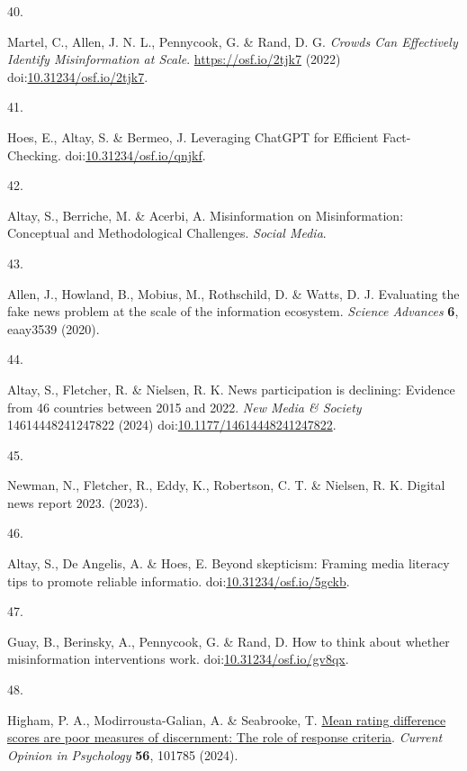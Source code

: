 \documentclass[
  doc,floatsintext]{apa6}
\newlength{\cslhangindent}
\newlength{\csllabelwidth}
\newenvironment{CSLReferences}[2] %
 {\begin{list}{}{%
  \setlength{\itemindent}{0pt}
  \setlength{\leftmargin}{0pt}
  \setlength{\parsep}{0pt}
  \ifodd #1
   \setlength{\leftmargin}{\cslhangindent}
   \setlength{\itemindent}{-1\cslhangindent}
  \fi
  \setlength{\itemsep}{#2\baselineskip}}}
 {\end{list}}
\newcommand{\CSLLeftMargin}[1]{\parbox[t]{\csllabelwidth}{\strut#1\strut}}
\newcommand{\CSLRightInline}[1]{\parbox[t]{\linewidth - \csllabelwidth}{\strut#1\strut}}
\begin{document}
\begin{CSLReferences}{0}{0}
\CSLLeftMargin{40. }%
\CSLRightInline{Martel, C., Allen, J. N. L., Pennycook, G. \& Rand, D. G. \emph{Crowds Can Effectively Identify Misinformation at Scale}. \url{https://osf.io/2tjk7} (2022) doi:\href{https://doi.org/10.31234/osf.io/2tjk7}{10.31234/osf.io/2tjk7}.}

\CSLLeftMargin{41. }%
\CSLRightInline{Hoes, E., Altay, S. \& Bermeo, J. Leveraging ChatGPT for Efficient Fact-Checking. doi:\href{https://doi.org/10.31234/osf.io/qnjkf}{10.31234/osf.io/qnjkf}.}

\CSLLeftMargin{42. }%
\CSLRightInline{Altay, S., Berriche, M. \& Acerbi, A. Misinformation on Misinformation: Conceptual and Methodological Challenges. \emph{Social Media}.}

\CSLLeftMargin{43. }%
\CSLRightInline{Allen, J., Howland, B., Mobius, M., Rothschild, D. \& Watts, D. J. Evaluating the fake news problem at the scale of the information ecosystem. \emph{Science Advances} \textbf{6}, eaay3539 (2020).}

\CSLLeftMargin{44. }%
\CSLRightInline{Altay, S., Fletcher, R. \& Nielsen, R. K. News participation is declining: Evidence from 46 countries between 2015 and 2022. \emph{New Media \& Society} 14614448241247822 (2024) doi:\href{https://doi.org/10.1177/14614448241247822}{10.1177/14614448241247822}.}

\CSLLeftMargin{45. }%
\CSLRightInline{Newman, N., Fletcher, R., Eddy, K., Robertson, C. T. \& Nielsen, R. K. Digital news report 2023. (2023).}

\CSLLeftMargin{46. }%
\CSLRightInline{Altay, S., De Angelis, A. \& Hoes, E. Beyond skepticism: Framing media literacy tips to promote reliable informatio. doi:\href{https://doi.org/10.31234/osf.io/5gckb}{10.31234/osf.io/5gckb}.}

\CSLLeftMargin{47. }%
\CSLRightInline{Guay, B., Berinsky, A., Pennycook, G. \& Rand, D. How to think about whether misinformation interventions work. doi:\href{https://doi.org/10.31234/osf.io/gv8qx}{10.31234/osf.io/gv8qx}.}

\CSLLeftMargin{48. }%
\CSLRightInline{Higham, P. A., Modirrousta-Galian, A. \& Seabrooke, T. \href{https://doi.org/10.1016/j.copsyc.2023.101785}{Mean rating difference scores are poor measures of discernment: The role of response criteria}. \emph{Current Opinion in Psychology} \textbf{56}, 101785 (2024).}


\end{CSLReferences}
\end{document}
